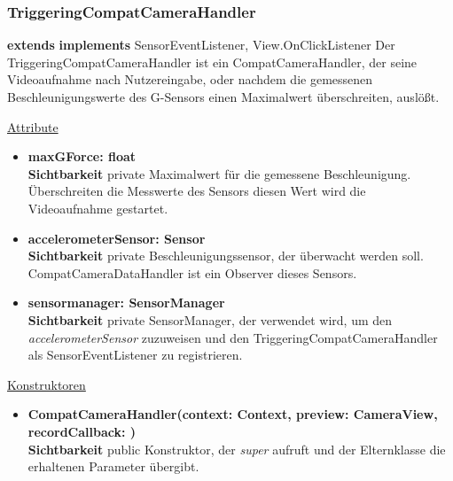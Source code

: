 \subsubsection{TriggeringCompatCameraHandler} \label{app:klasse:TriggeringCompatCameraHandler}
\textbf{extends}  \newline
\textbf{implements} SensorEventListener, View.OnClickListener \newline
Der TriggeringCompatCameraHandler ist ein CompatCameraHandler, der seine Videoaufnahme nach Nutzereingabe, oder nachdem die gemessenen Beschleunigungswerte des G-Sensors einen Maximalwert überschreiten, auslößt.
\newline

\underline{Attribute}
\begin{itemize}
\itemsep0pt
\item \textbf{maxGForce: float} \hfill\\ 
\textbf{Sichtbarkeit} private \newline
Maximalwert für die gemessene Beschleunigung. Überschreiten die Messwerte des Sensors diesen Wert wird die Videoaufnahme gestartet.

\item \textbf{accelerometerSensor: Sensor} \hfill\\ 
\textbf{Sichtbarkeit} private \newline
Beschleunigungssensor, der überwacht werden soll. CompatCameraDataHandler ist ein Observer dieses Sensors.

\item \textbf{sensormanager: SensorManager} \hfill\\ 
\textbf{Sichtbarkeit} private \newline
SensorManager, der verwendet wird, um den \textit{accelerometerSensor} zuzuweisen und den TriggeringCompatCameraHandler als SensorEventListener zu registrieren.
\end{itemize}

\underline{Konstruktoren}
\begin{itemize}
\itemsep0pt
\item \textbf{CompatCameraHandler(context: Context, preview: CameraView, recordCallback: )} \hfill\\
\textbf{Sichtbarkeit} public\newline
Konstruktor, der \textit{super} aufruft und der Elternklasse die erhaltenen Parameter übergibt.
\end{itemize}

